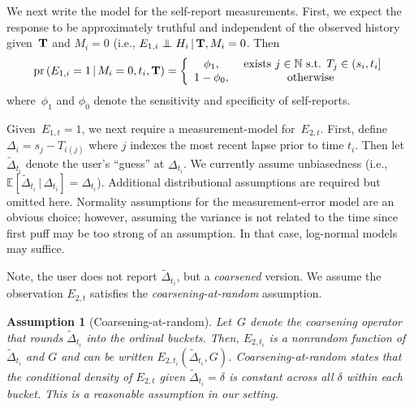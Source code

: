 \documentclass[11pt]{amsart}
\def\pr{\mathop{\text{pr}}\nolimits}
\def\pr{\mathop{\text{pr}}\nolimits}
\def\E{\mathcal{E}}
\newtheorem{assumption}[thm]{Assumption}
\def\indep{\mathrel{\rlap{$\perp$}\kern1.6pt\mathord{\perp}}}
\def\E{\mathbb{E}}
\def\given{\, | \,}
\def\Nat{\mathbb{N}}
\def\bfT{{\bf T}}
\begin{document}
We next write the model for the self-report measurements.
First, we expect the response to be approximately truthful and
independent of the observed history given~$\bfT$ and $M_{i} = 0$
(i.e., $E_{1,i} \indep H_{i} \given \bfT, M_{i} = 0$. Then
\[
\pr \left( E_{1,i} = 1 \given M_{i} = 0, t_i, \bfT \right) =  \left \{ 
  \begin{array}{c c}
    \phi_1, & \text{ exists } j \in \Nat \text{ s.t. } T_j \in (s_i, t_i] \\
    1-\phi_0, & \text{ otherwise } \\
  \end{array}
\right .
\]
where~$\phi_1$ and $\phi_0$ denote the sensitivity and specificity of
self-reports.  %

Given~$E_{1,t} = 1$, we next require a measurement-model
for~$E_{2,t}$.  First, define~$\Delta_{i} = s_j - T_{i(j)}$ where $j$
indexes the most recent lapse prior to time $t_i$. 
Then let~$\tilde \Delta_{t_i}$ denote the user's ``guess'' at
$\Delta_{t_i}$.  
We currently assume unbiasedness (i.e., $\E [ \tilde \Delta_{t_i}
\given \Delta_{t_i}] = \Delta_{t_i}$). Additional distributional
assumptions are required but omitted here.  Normality assumptions for the
measurement-error model are an obvious choice; however, assuming the
variance is not related to the time since first puff may be too strong
of an assumption.  In that case, log-normal models may suffice. 

Note, the user does not report $\tilde \Delta_{t_i}$, but a
\emph{coarsened} version.  We assume the observation $E_{2,t}$
satisfies the \emph{coarsening-at-random} assumption.  

\begin{assumption}[Coarsening-at-random] \normalfont
Let~$G$ denote the coarsening operator that rounds $\tilde
\Delta_{t_i}$ into the ordinal buckets.  
Then, $E_{2,t_i}$ is a nonrandom function of $\tilde \Delta_{t_i}$
and $G$ and can be written $E_{2,t_i} (\tilde \Delta_{t_i}, G)$.
\emph{Coarsening-at-random} states that the conditional density of
$E_{2,t}$ given $\tilde \Delta_{t_i} = \delta$ is constant across all
$\delta$ within each bucket.  
This is a reasonable assumption in our setting.  
\end{assumption}
\end{document}
